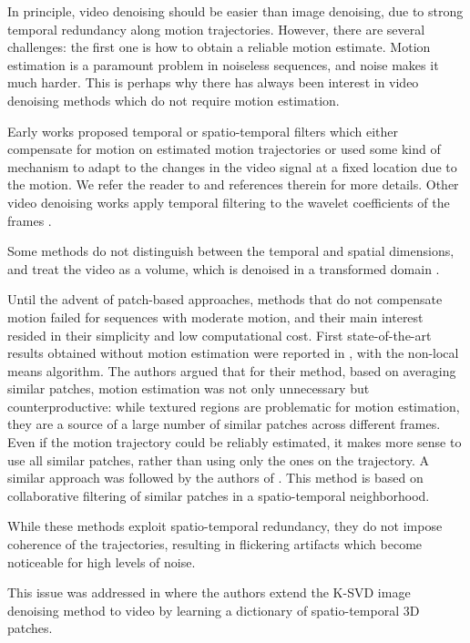 \documentclass{llncs}
\begin{document}
In principle, video denoising should be easier than image denoising, due to 
strong temporal redundancy along motion trajectories. However, there are
several challenges: the first one is how to obtain a reliable motion
estimate. Motion estimation is a paramount problem in noiseless sequences,
and noise makes it
much harder. This is perhaps why there has always been interest in video denoising
methods which do not require motion estimation.

Early works proposed temporal or spatio-temporal filters which either compensate
for motion on estimated motion trajectories or used some kind of mechanism to
adapt to the changes in the video signal at a fixed location due to the motion.
We refer the reader to \cite{Brailean1995a} and references therein for more details.
Other video denoising works apply temporal filtering to the wavelet coefficients 
of the frames \cite{Jin2006,Zlokolica2006a}. 

Some methods do not distinguish between the temporal and spatial dimensions,
and treat the video as a volume, which is denoised in a transformed domain
\cite{Rajpoot2003,Wilson2004,Selesnick2003}. 

Until the advent of patch-based approaches, methods that do not compensate
motion failed for sequences with moderate motion, and their main interest resided
in their simplicity and low computational cost. First state-of-the-art results
obtained without motion estimation were reported in \cite{Buades2005v}, with the
non-local means algorithm. The authors argued that for their method, based on
averaging similar patches, motion estimation was not only unnecessary but
counterproductive: while textured regions are problematic for motion
estimation, they are a source of a large number of similar patches across
different frames. Even if the motion trajectory could be reliably estimated, it
makes more sense to use all similar patches, rather than using only the ones on the
trajectory.
%
A similar approach was followed by the authors of \cite{Dabov2007v}. This method is based
on collaborative filtering of similar patches in a
spatio-temporal neighborhood. 

While these methods exploit spatio-temporal redundancy, they do not impose
coherence of the trajectories, resulting in flickering
artifacts which become noticeable for high levels of noise. 

This issue was addressed in \cite{Protter2007,Protter2009} where the authors extend
the K-SVD \cite{Elad2006} image denoising method to video by learning a
dictionary of spatio-temporal 3D patches. 
\end{document}
